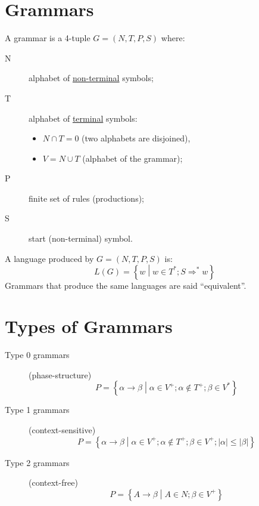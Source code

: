 \section{Grammars}
A grammar is a 4-tuple $G = (N, T, P, S)$ where:
\begin{description}
	\item[N] alphabet of \underline{non-terminal} symbols;
	\item[T] alphabet of \underline{terminal} symbols:
	\begin{itemize}
		\item $N \cap T = 0$ (two alphabets are disjoined),
		\item $V = N \cup T$ (alphabet of the grammar);
	\end{itemize}
	\item[P] finite set of rules (productions);
	\item[S] start (non-terminal) symbol.
\end{description}

A language produced by $G = (N, T, P, S)$ is:
$$
	L(G) = \left\{w \middle| w \in T^\ast; S \Rightarrow^\ast w\right\}
$$
Grammars that produce the same languages are said ``equivalent''.

\section{Types of Grammars}
\begin{description}
	\item[Type 0 grammars] (phase-structure)\\
		$$
			P = \left\{\alpha \to \beta \middle| \alpha \in V^+; \alpha \notin T^+; \beta \in V^\ast \right\}
		$$
	\item[Type 1 grammars] (context-sensitive)\\
		$$
			P = \left\{\alpha \to \beta \middle| \alpha \in V^+; \alpha \notin T^+; \beta \in V^+; |\alpha| \leq |\beta| \right\}
		$$
	\item[Type 2 grammars] (context-free)\\
		$$
			P = \left\{A \to \beta \middle| A \in N; \beta \in V^+ \right\}
		$$
\end{description}

